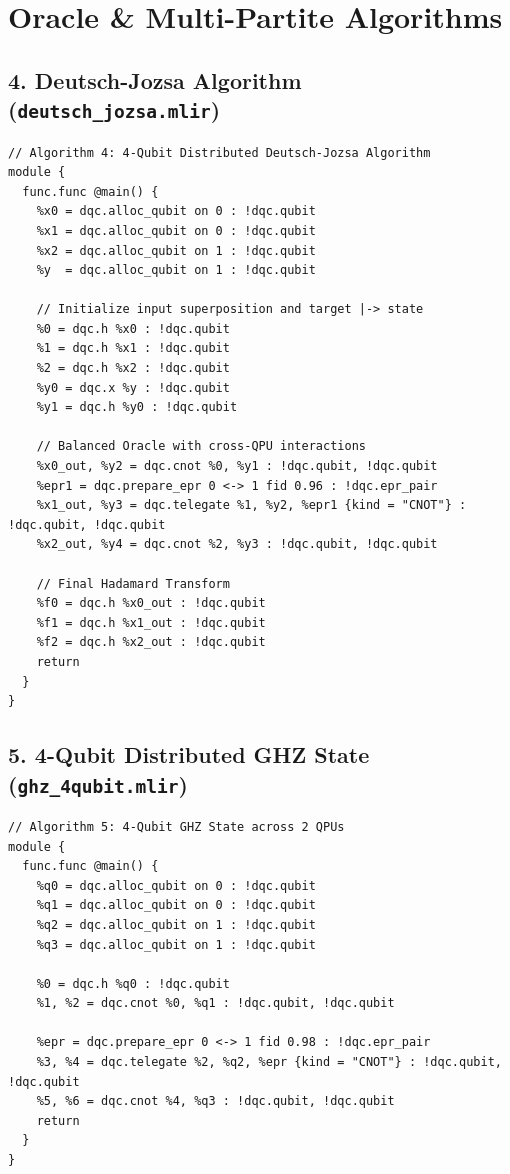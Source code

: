 \section{Oracle \& Multi-Partite Algorithms}

\subsection{4. Deutsch-Jozsa Algorithm (\texttt{deutsch\_jozsa.mlir})}
\begin{lstlisting}[language=MLIR, caption={deutsch\_jozsa.mlir}]
// Algorithm 4: 4-Qubit Distributed Deutsch-Jozsa Algorithm
module {
  func.func @main() {
    %x0 = dqc.alloc_qubit on 0 : !dqc.qubit
    %x1 = dqc.alloc_qubit on 0 : !dqc.qubit
    %x2 = dqc.alloc_qubit on 1 : !dqc.qubit
    %y  = dqc.alloc_qubit on 1 : !dqc.qubit

    // Initialize input superposition and target |-> state
    %0 = dqc.h %x0 : !dqc.qubit
    %1 = dqc.h %x1 : !dqc.qubit
    %2 = dqc.h %x2 : !dqc.qubit
    %y0 = dqc.x %y : !dqc.qubit
    %y1 = dqc.h %y0 : !dqc.qubit

    // Balanced Oracle with cross-QPU interactions
    %x0_out, %y2 = dqc.cnot %0, %y1 : !dqc.qubit, !dqc.qubit
    %epr1 = dqc.prepare_epr 0 <-> 1 fid 0.96 : !dqc.epr_pair
    %x1_out, %y3 = dqc.telegate %1, %y2, %epr1 {kind = "CNOT"} : !dqc.qubit, !dqc.qubit
    %x2_out, %y4 = dqc.cnot %2, %y3 : !dqc.qubit, !dqc.qubit

    // Final Hadamard Transform
    %f0 = dqc.h %x0_out : !dqc.qubit
    %f1 = dqc.h %x1_out : !dqc.qubit
    %f2 = dqc.h %x2_out : !dqc.qubit
    return
  }
}
\end{lstlisting}

\subsection{5. 4-Qubit Distributed GHZ State (\texttt{ghz\_4qubit.mlir})}
\begin{lstlisting}[language=MLIR, caption={ghz\_4qubit.mlir}]
// Algorithm 5: 4-Qubit GHZ State across 2 QPUs
module {
  func.func @main() {
    %q0 = dqc.alloc_qubit on 0 : !dqc.qubit
    %q1 = dqc.alloc_qubit on 0 : !dqc.qubit
    %q2 = dqc.alloc_qubit on 1 : !dqc.qubit
    %q3 = dqc.alloc_qubit on 1 : !dqc.qubit

    %0 = dqc.h %q0 : !dqc.qubit
    %1, %2 = dqc.cnot %0, %q1 : !dqc.qubit, !dqc.qubit
    
    %epr = dqc.prepare_epr 0 <-> 1 fid 0.98 : !dqc.epr_pair
    %3, %4 = dqc.telegate %2, %q2, %epr {kind = "CNOT"} : !dqc.qubit, !dqc.qubit
    %5, %6 = dqc.cnot %4, %q3 : !dqc.qubit, !dqc.qubit
    return
  }
}
\end{lstlisting}

